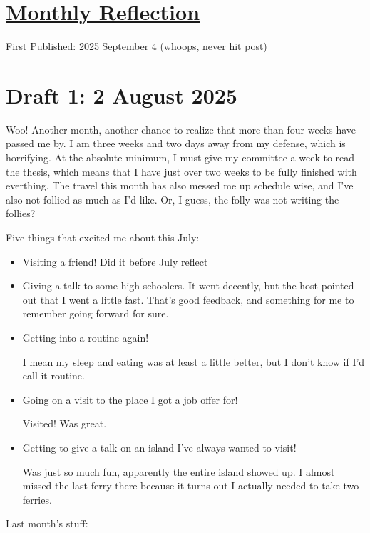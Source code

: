 \documentclass[12pt]{article}
\renewcommand{\,}{\textsuperscript{,}}
\begin{document}
  
\doublespacing  
\section{\href{reflection-july-25.html}{Monthly Reflection}}  
First Published: 2025 September 4 (whoops, never hit post)

\section{Draft 1: 2 August 2025}

Woo! Another month, another chance to realize that more than four weeks have passed me by.  
I am three weeks and two days away from my defense, which is horrifying.  
At the absolute minimum, I must give my committee a week to read the thesis, which means that I have just over two weeks to be fully finished with everthing.  
The travel this month has also messed me up schedule wise, and I've also not follied as much as I'd like.  
Or, I guess, the folly was not writing the follies?

Five things that excited me about this July:

\begin{itemize}

\item Visiting a friend! Did it before July reflect  
\item Giving a talk to some high schoolers. It went decently, but the host pointed out that I went a little fast.  
That's good feedback, and something for me to remember going forward for sure.  
\item Getting into a routine again!

I mean my sleep and eating was at least a little better, but I don't know if I'd call it routine.

\item Going on a visit to the place I got a job offer for!

Visited! Was great.

\item Getting to give a talk on an island I've always wanted to visit!

Was just so much fun, apparently the entire island showed up.  
I almost missed the last ferry there because it turns out I actually needed to take two ferries.

\end{itemize}

Last month's stuff:
\end{document}
